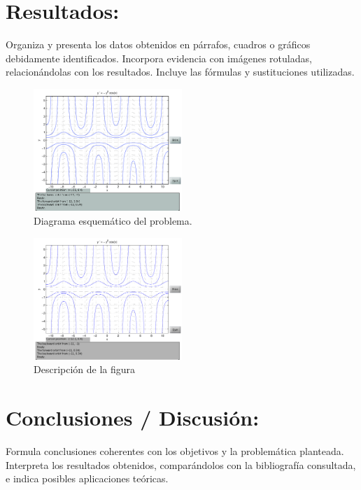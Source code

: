 \documentclass[10pt,a4paper]{article}
\begin{document}
\section{Resultados:} 

Organiza y presenta los datos obtenidos en párrafos, cuadros o gráficos debidamente identificados. Incorpora evidencia con imágenes rotuladas, relacionándolas con los resultados. Incluye las fórmulas y sustituciones utilizadas.  
\begin{figure}[ht]
\centering
\includegraphics[width=0.5\textwidth]{fig1.png}
\caption{Diagrama esquemático del problema.}
\end{figure}

\begin{figure}[h]
    \centering
    \includegraphics[width=0.5\textwidth]{fig2.pdf}
    \caption{Descripción de la figura}
\end{figure}

\section{Conclusiones / Discusión:} 

Formula conclusiones coherentes con los objetivos y la problemática planteada. Interpreta los resultados obtenidos, comparándolos con la bibliografía consultada, e indica posibles aplicaciones teóricas.  



\end{document}
